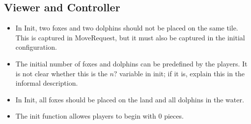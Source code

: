 \documentclass[a4paper,11pt]{article}
\begin{document}
    \subsection{Viewer and Controller}
    \begin{itemize}
        \item In Init, two foxes and two dolphins should not be placed on the same tile. This is captured in MoveRequest, but it must also be captured in the initial configuration.
        \item The initial number of foxes and dolphins can be predefined by the players. It is not clear whether this is the $n?$ variable in init; if it is, explain this in the informal description.
        \item In Init, all foxes should be placed on the land and all dolphins in the water.
        \item The init function allowes players to begin with $0$ pieces.
    \end{itemize}
\end{document}
